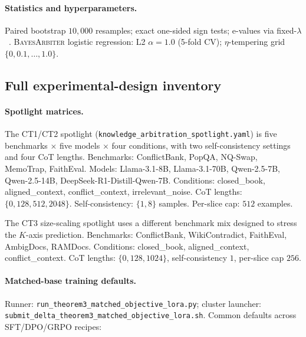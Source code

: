 \paragraph{Statistics and hyperparameters.}
Paired bootstrap $10{,}000$ resamples; exact one-sided sign tests;
e-values via fixed-$\lambda$~\citep{shafer2021testing,ramdas2023game}.
\textsc{BayesArbiter} logistic regression: L2 $\alpha\!=\!1.0$ (5-fold CV);
$\eta$-tempering grid $\{0,0.1,\ldots,1.0\}$.

\subsection{Full experimental-design inventory}
\label{app:exp-design-inventory}

\paragraph{Spotlight matrices.}
The CT1/CT2 spotlight (\texttt{knowledge\_arbitration\_spotlight.yaml}) is
five benchmarks $\times$ five models $\times$ four conditions, with two
self-consistency settings and four CoT lengths.
Benchmarks: ConflictBank, PopQA, NQ-Swap, MemoTrap, FaithEval.
Models: Llama-3.1-8B, Llama-3.1-70B, Qwen-2.5-7B, Qwen-2.5-14B,
DeepSeek-R1-Distill-Qwen-7B.
Conditions: closed\_book, aligned\_context, conflict\_context,
irrelevant\_noise.
CoT lengths: $\{0, 128, 512, 2048\}$.
Self-consistency: $\{1, 8\}$ samples.
Per-slice cap: $512$ examples.

The CT3 size-scaling spotlight uses a different benchmark mix
designed to stress the $K$-axis prediction.  Benchmarks:
ConflictBank, WikiContradict, FaithEval, AmbigDocs, RAMDocs.
Conditions: closed\_book, aligned\_context, conflict\_context.
CoT lengths: $\{0, 128, 1024\}$, self-consistency $1$, per-slice
cap $256$.

\paragraph{Matched-base training defaults.}
Runner: \texttt{run\_theorem3\_matched\_objective\_lora.py}; cluster
launcher: \texttt{submit\_delta\_theorem3\_matched\_objective\_lora.sh}.
Common defaults across SFT/DPO/GRPO recipes:

